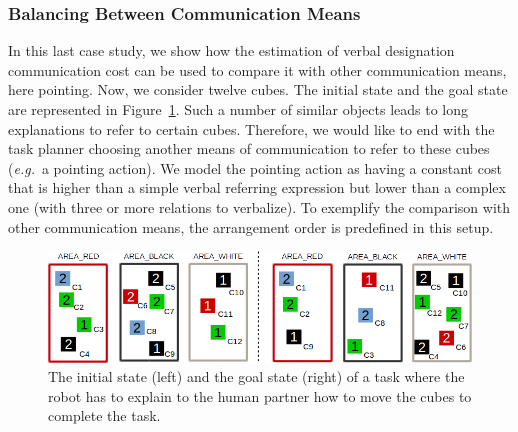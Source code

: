 \documentclass[a4paper,11pt,twoside]{StyleThese}
\begin{document}
\subsubsection{Balancing Between Communication Means}

In this last case study, we show how the estimation of verbal designation communication cost can be used to compare it with other communication means, here pointing. Now, we consider twelve cubes. The initial state and the goal state are represented in Figure~\ref{fig:case3}. Such a number of similar objects leads to long explanations to refer to certain cubes. Therefore, we would like to end with the task planner choosing another means of communication to refer to these cubes (\textit{e.g.}~a pointing action). We model the pointing action as having a constant cost that is higher than a simple verbal referring expression but lower than a complex one (with three or more relations to verbalize). To exemplify the comparison with other communication means, the arrangement order is predefined in this setup. %

\begin{figure}[t!]
\centering
\includegraphics[scale=0.5]{figures/chapter3/case3.png}
\caption{\label{fig:case3} The initial state (left) and the goal state (right) of a task where the robot has to explain to the human partner how to move the cubes to complete the task. }
\end{figure}

\end{document}
